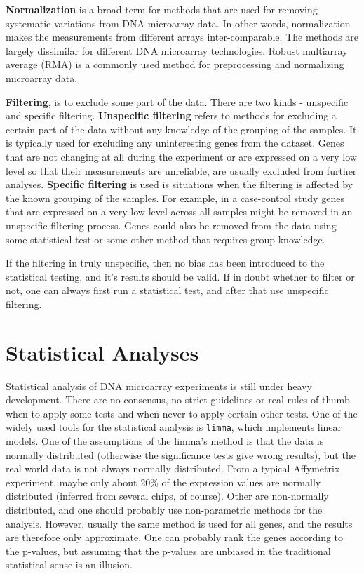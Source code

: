 \documentclass[oneside, a4paper, 11pt]{book}
\begin{document}
\textbf{Normalization} is a broad term for methods that are used for removing systematic variations from DNA microarray data. In other words, normalization makes the measurements from different arrays inter-comparable. The methods are largely dissimilar for different DNA microarray technologies. Robust multiarray average (RMA) is a commonly used method for preprocessing and normalizing microarray data.
\newline

\textbf{Filtering}, is to exclude some part of the data. There are two kinds - unspecific and specific filtering. \textbf{Unspecific filtering} refers to methods for excluding a certain part of the data without any knowledge of the grouping of the samples. It is typically used for excluding any uninteresting genes from the dataset. Genes that are not changing at all during the experiment or are expressed on a very low level so that their measurements are unreliable, are usually excluded from further analyses. \textbf{Specific filtering} is used is situations when the filtering is affected by the known grouping of the samples. For example, in a case-control study genes that are expressed on a very low level across all samples might be removed in an unspecific filtering process. Genes could also be removed from the data using some statistical test or some other method that requires group knowledge.

If the filtering in truly unspecific, then no bias has been introduced to the statistical testing, and it’s results should be valid. If in doubt whether to filter or not, one can always first run a statistical test, and after that use unspecific filtering.

\section{Statistical Analyses}
Statistical analysis of DNA microarray experiments is still under heavy development. There are no consensus, no strict guidelines or real rules of thumb when to apply some tests and when never to apply certain other tests. One of the widely used tools for the statistical analysis is \texttt{limma}, which implements
linear models. One of the assumptions of the limma’s method is that the data is normally distributed (otherwise the significance tests give wrong results), but the real world data is not always normally distributed. From a typical Affymetrix experiment, maybe only about 20\% of the expression values are normally distributed (inferred from several chips, of course). Other are non-normally distributed, and one should probably use non-parametric methods for the analysis. However, usually the same method is used for all genes, and the results are therefore only approximate. One can probably rank the genes according to the p-values, but assuming that the p-values are unbiased in the traditional statistical sense is an illusion.
\end{document}
